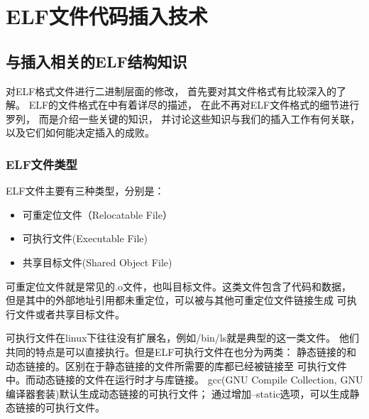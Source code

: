\chapter{ELF文件代码插入技术}




\section{与插入相关的ELF结构知识}

对ELF格式文件进行二进制层面的修改，
首先要对其文件格式有比较深入的了解。
ELF的文件格式在\cite{elf1.2}中有着详尽的描述，
在此不再对ELF文件格式的细节进行罗列，
而是介绍一些关键的知识，
并讨论这些知识与我们的插入工作有何关联，
以及它们如何能决定插入的成败。

\subsection{ELF文件类型}

ELF文件主要有三种类型，分别是：

\begin{itemize}
 \item 可重定位文件（Relocatable File）
 \item 可执行文件(Executable File)
 \item 共享目标文件(Shared Object File)
\end{itemize}

可重定位文件就是常见的.o文件，也叫目标文件。这类文件包含了代码和数据，
但是其中的外部地址引用都未重定位，可以被与其他可重定位文件链接生成
可执行文件或者共享目标文件。

可执行文件在linux下往往没有扩展名，例如/bin/ls就是典型的这一类文件。
他们共同的特点是可以直接执行。但是ELF可执行文件在也分为两类：
静态链接的和动态链接的。区别在于静态链接的文件所需要的库都已经被链接至
可执行文件中。而动态链接的文件在运行时才与库链接。
gcc(GNU Compile Collection, GNU编译器套装)默认生成动态链接的可执行文件；
通过增加--static选项，可以生成静态链接的可执行文件。

